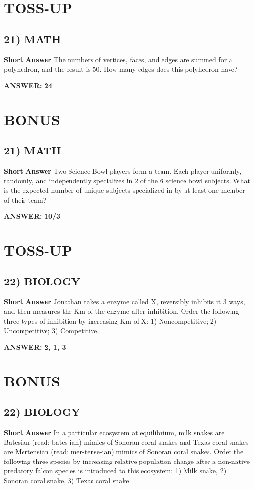 \documentclass{article}
\begin{document}
\section*{TOSS-UP}
\subsection*{21) MATH}
\textbf{Short Answer} The numbers of vertices, faces, and edges are summed for a polyhedron, and the result is 50. How many edges does this polyhedron have?

\textbf{ANSWER: 24}

\section*{BONUS}
\subsection*{21) MATH}
\textbf{Short Answer} Two Science Bowl players form a team.
Each player uniformly, randomly, and independently specializes in 2 of the 6 science bowl subjects.
What is the expected number of unique subjects specialized in by at least one member of their team?

\textbf{ANSWER: 10/3}

\section*{TOSS-UP}
\subsection*{22) BIOLOGY}
\textbf{Short Answer} Jonathan takes a enzyme called X, reversibly inhibits it 3 ways, and then measures the Km of the enzyme after inhibition.
Order the following three types of inhibition by increasing Km of X: 1) Noncompetitive; 2) Uncompetitive; 3) Competitive.

\textbf{ANSWER: 2, 1, 3}

\section*{BONUS}
\subsection*{22) BIOLOGY}
\textbf{Short Answer} In a particular ecosystem at equilibrium, milk snakes are Batesian (read: bates-ian) mimics of Sonoran coral snakes and Texas coral snakes are Mertensian (read: mer-tense-ian) mimics of Sonoran coral snakes.
Order the following three species by increasing relative population change after a non-native predatory falcon species is introduced to this ecosystem: 1) Milk snake, 2) Sonoran coral snake, 3) Texas coral snake
\end{document}

